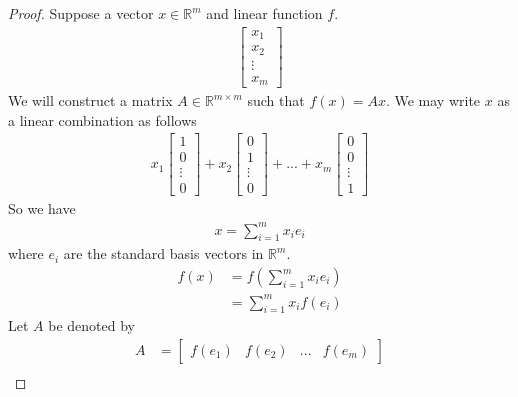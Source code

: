 \documentclass[11pt]{article}
\begin{document}
\begin{proof}
    Suppose a vector $x \in \mathbb{R}^m$ and linear function $f$.
   \begin{align*}
        \begin{bmatrix}
            x_1 \\
            x_2 \\
            \vdots \\
            x_m
        \end{bmatrix}
    \end{align*}
    We will construct a matrix $A \in \mathbb{R}^{m\times m}$ such that $f(x)=Ax$.
    We may write $x$ as a linear combination as follows
    \begin{align*}
        x_1
        \begin{bmatrix}
            1 \\
            0 \\
            \vdots \\
            0
        \end{bmatrix}
        +
        x_2
        \begin{bmatrix}
            0 \\
            1 \\
            \vdots \\
            0
        \end{bmatrix}
        +
        ...
        +
        x_m
        \begin{bmatrix}
            0 \\
            0 \\
            \vdots \\
            1
        \end{bmatrix}
    \end{align*}
    So we have
    \begin{align*}
        x =
        \sum_{i=1}^{m} x_i e_i
    \end{align*}
    where $e_i$ are the standard basis vectors in $\mathbb{R}^m$.
    \begin{align*}
        f(x) &=
        f\left(
            \sum_{i=1}^{m} x_i e_i
        \right) \\
        &=
        \sum_{i=1}^{m} x_i f(e_i)
    \end{align*}
    Let $A$ be denoted by
    \begin{align*}
        A &=
        \begin{bmatrix}
            f(e_1) & f(e_2) & ... & f(e_m)
        \end{bmatrix} \\

\end{align*}
\end{proof}
\end{document}
